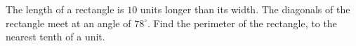 The length of a rectangle is $10$ units longer than its width. The diagonals of the rectangle meet at an angle of $78^\circ$. Find the perimeter of the rectangle, to the nearest tenth of a unit.
